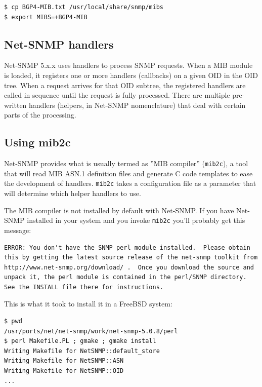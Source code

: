 \documentclass[11pt]{article}
\begin{document}
\begin{verbatim}
$ cp BGP4-MIB.txt /usr/local/share/snmp/mibs
$ export MIBS=+BGP4-MIB
\end{verbatim}

\subsection{Net-SNMP handlers}

Net-SNMP 5.x.x uses handlers to process SNMP requests.  When a MIB module is
loaded, it registers one or more handlers (callbacks) on a given OID in the OID
tree.  When a request arrives for that OID subtree, the registered handlers are called in sequence until the request is fully processed.  There are multiple pre-written handlers (helpers, in Net-SNMP nomenclature) that deal with certain parts of the processing.  


\subsection{Using mib2c}

Net-SNMP provides what is usually termed as ''MIB compiler'' (\texttt{mib2c}), a
tool that will read MIB ASN.1 definition files and generate C code templates to
ease the development of handlers.  \texttt{mib2c} takes a configuration file as
a parameter that will determine which helper handlers to use. 

The MIB compiler is not installed by default with Net-SNMP.  If you have
Net-SNMP installed in your system and you invoke \texttt{mib2c} you'll probably
get this message:

\begin{verbatim}
ERROR: You don't have the SNMP perl module installed.  Please obtain
this by getting the latest source release of the net-snmp toolkit from
http://www.net-snmp.org/download/ .  Once you download the source and
unpack it, the perl module is contained in the perl/SNMP directory.
See the INSTALL file there for instructions.
\end{verbatim}

This is what it took to install it in a FreeBSD system:

\begin{verbatim}
$ pwd
/usr/ports/net/net-snmp/work/net-snmp-5.0.8/perl
$ perl Makefile.PL ; gmake ; gmake install
Writing Makefile for NetSNMP::default_store
Writing Makefile for NetSNMP::ASN
Writing Makefile for NetSNMP::OID
...
\end{verbatim}
\end{document}
